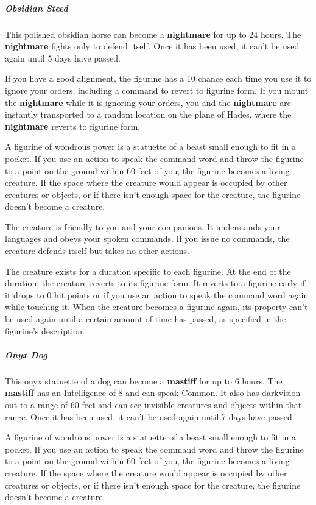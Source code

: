 \documentclass[10pt,a4paper,twoside,bg=print,twocolumn,openany,nodeprecatedcode]{dndbook}
\begin{document}
\subparagraph{Obsidian Steed}
This polished obsidian horse can become a \textbf{nightmare} for up to 24 hours. The \textbf{nightmare} fights only to defend itself. Once it has been used, it can't be used again until 5 days have passed.

If you have a good alignment, the figurine has a 10 chance each time you use it to ignore your orders, including a command to revert to figurine form. If you mount the \textbf{nightmare} while it is ignoring your orders, you and the \textbf{nightmare} are instantly transported to a random location on the plane of Hades, where the \textbf{nightmare} reverts to figurine form.

A figurine of wondrous power is a statuette of a beast small enough to fit in a pocket. If you use an action to speak the command word and throw the figurine to a point on the ground within 60 feet of you, the figurine becomes a living creature. If the space where the creature would appear is occupied by other creatures or objects, or if there isn't enough space for the creature, the figurine doesn't become a creature.

The creature is friendly to you and your companions. It understands your languages and obeys your spoken commands. If you issue no commands, the creature defends itself but takes no other actions.

The creature exists for a duration specific to each figurine. At the end of the duration, the creature reverts to its figurine form. It reverts to a figurine early if it drops to 0 hit points or if you use an action to speak the command word again while touching it. When the creature becomes a figurine again, its property can't be used again until a certain amount of time has passed, as specified in the figurine's description.

\subparagraph{Onyx Dog}
This onyx statuette of a dog can become a \textbf{mastiff} for up to 6 hours. The \textbf{mastiff} has an Intelligence of 8 and can speak Common. It also has darkvision out to a range of 60 feet and can see invisible creatures and objects within that range. Once it has been used, it can't be used again until 7 days have passed.

A figurine of wondrous power is a statuette of a beast small enough to fit in a pocket. If you use an action to speak the command word and throw the figurine to a point on the ground within 60 feet of you, the figurine becomes a living creature. If the space where the creature would appear is occupied by other creatures or objects, or if there isn't enough space for the creature, the figurine doesn't become a creature.
\end{document}
